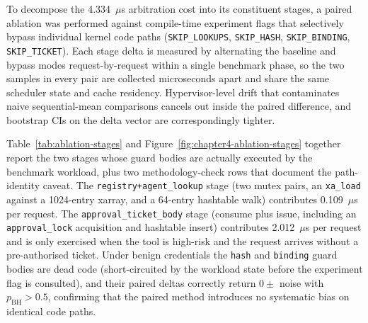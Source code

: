 To decompose the \num{4.334}~$\mu$s arbitration cost into its constituent stages, a paired ablation was performed against compile-time experiment flags that selectively bypass individual kernel code paths (\texttt{SKIP\_\allowbreak LOOKUPS}, \texttt{SKIP\_HASH}, \texttt{SKIP\_\allowbreak BINDING}, \texttt{SKIP\_\allowbreak TICKET}).
Each stage delta is measured by alternating the baseline and bypass modes request-by-request within a single benchmark phase, so the two samples in every pair are collected microseconds apart and share the same scheduler state and cache residency.
Hypervisor-level drift that contaminates naive sequential-mean comparisons cancels out inside the paired difference, and bootstrap CIs on the delta vector are correspondingly tighter.

Table~\ref{tab:ablation-stages} and Figure~\ref{fig:chapter4-ablation-stages} together report the two stages whose guard bodies are actually executed by the benchmark workload, plus two methodology-check rows that document the path-identity caveat.
The \texttt{registry+agent\_\allowbreak lookup} stage (two mutex pairs, an \texttt{xa\_load} against a 1024-entry xarray, and a 64-entry hashtable walk) contributes \num{0.109}~$\mu$s per request.
The \texttt{approval\_\allowbreak ticket\_\allowbreak body} stage (consume plus issue, including an \texttt{approval\_\allowbreak lock} acquisition and hashtable insert) contributes \num{2.012}~$\mu$s per request and is only exercised when the tool is high-risk and the request arrives without a pre-authorised ticket.
Under benign credentials the \texttt{hash} and \texttt{binding} guard bodies are dead code (short-circuited by the workload state before the experiment flag is consulted), and their paired deltas correctly return $0 \pm$ noise with $p_{\text{BH}} > 0.5$, confirming that the paired method introduces no systematic bias on identical code paths.

